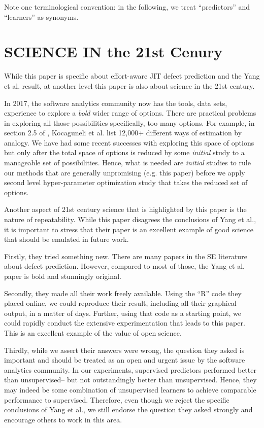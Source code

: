 \documentclass[sigconf]{acmart}
\theoremstyle{break}
\begin{document}
Note one terminological convention: in the following, we treat ``predictors'' and ``learners'' as synonyms.

\section{SCIENCE IN the 21{\lowercase{st}} Cenury}\label{comment}


While this paper is specific about effort-aware JIT defect prediction and the Yang et al. result, at another level this paper is also about science in the 21st century. 
 
In 2017, the software analytics community now has the tools, data sets, experience to explore a {\em bold } wider range of options. There are practical problems in exploring all those possibilities specifically, too many options. For example, in section 2.5 of \cite{kocaguneli2012exploiting}, Kocaguneli et al. list  12,000+ different ways of estimation by analogy. We have had some recent successes with exploring this space of options \cite{fu2016tuning} but only after the total space of options is reduced by some {\em initial} study to a manageable set of possibilities. Hence, what is needed are {\em initial} studies to rule our methods that are generally unpromising (e.g. this paper) before we apply second level hyper-parameter optimization study that takes the reduced set of options.
 
Another aspect of 21st century science that is highlighted by this paper is the nature of repeatability. While this paper disagrees the conclusions of Yang et al., it is important to stress that their paper is an excellent example of good science that should be emulated in future work. 

Firstly, they tried something new. There are many papers
in the SE literature about defect prediction. However, compared to most
of those, the Yang et al. paper is bold and stunningly original.

Secondly, they made all their work freely available. Using
the ``R'' code they placed online, we could reproduce their result,
including all their graphical output, in a matter of days.  
Further, using that code as a starting point, we could rapidly
conduct the extensive experimentation that leads to this paper. 
This is an excellent example of the value of open science.

Thirdly, while we assert their answers were wrong, the question
they asked is important and should be treated as an open and urgent
issue by the software analytics  community. 
In our experiments, supervised
	predictors performed better than unsupervised--
	but not   outstandingly
	better  than unsupervised. 
	Hence, they may indeed be some
	combination of unsupervised
	learners to achieve comparable performance to supervised.
	Therefore, even though we reject the specific conclusions of Yang et al.,
	we still endorse the question they asked  strongly
	and encourage others to work in this area.
\end{document}
